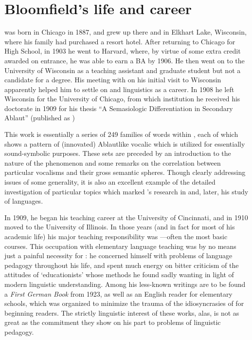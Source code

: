 \section{Bloomfield's life and career}

{\Bloomfield} was born in Chicago in 1887, and grew up there and in
Elkhart Lake, Wisconsin, where his family had purchased a resort
hotel. After returning to Chicago for High School, in 1903 he went to
Harvard, where, by virtue of some extra credit awarded on entrance, he
was able to earn a BA by 1906. He then went on to the University of
Wisconsin as a teaching assistant and graduate student but not a
candidate for a degree.  His meeting with  on his
initial visit to Wisconsin apparently helped him to settle on 
and linguistics as a career. In 1908 he left Wisconsin for the
University of Chicago, from which institution he received his
doctorate in 1909 for his thesis ``A Semasiologic Differentiation in
 Secondary Ablaut'' (published as
\citealt{bloomfield09:thesis1,bloomfield10:thesis2})

This work is essentially a series of 249 families of words within
, each of which shows a pattern of (innovated) Ablautlike
vocalic  which is utilized for essentially sound-symbolic
purposes. These sets are preceded by an introduction to the nature of
the phenomenon and some remarks on the correlation between particular
vocalisms and their gross semantic spheres. Though clearly addressing
issues of some generality, it is also an excellent example of the
detailed investigation of particular topics which marked {\Bloomfield}'s
research in  and, later, his study of  languages.

In 1909, he began his teaching career at the University of Cincinnati,
and in 1910 moved to the University of Illinois. In those years (and
in fact for most of his academic life) his major teaching
responsibility was —often the most basic courses. This
occupation with elementary language teaching was by no means just a
painful necessity for {\Bloomfield}: he concerned himself with problems
of language pedagogy throughout his life, and spent much energy on
bitter criticism of the attitudes of `educationists' whose methods he
found sadly wanting in light of modern linguistic understanding. Among
his less-known writings are to be found a \textsl{First {German} Book}
from 1923, as well as an {English} reader for elementary schools, which
was organized to minimize the trauma of the idiosyncrasies of 
 for beginning readers. The strictly linguistic interest of
these works, alas, is not as great as the commitment they show on his
part to problems of linguistic pedagogy.

